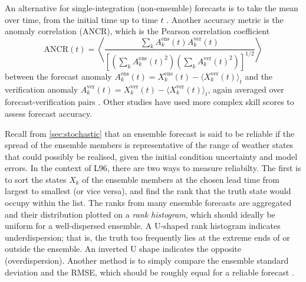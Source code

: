 \documentclass[titlepage,twoside]{article}
\numberwithin{equation}{section}
\begin{document}
An alternative for single-integration
(non-ensemble) forecasts is to take the mean over time, from the initial time
up to time $t$ \parencite{bhouri2023}. Another accuracy metric is the
anomaly correlation (ANCR), which is the Pearson correlation coefficient
\begin{equation*}
    \mathrm{ANCR}(t) = \left\langle
        \frac{
            \sum_k A_k^\text{ens}(t) A_k^\text{ver}(t)
        }{
            \left[
                \left( \sum_k A_k^\text{ens}(t)^2 \right)
                \left( \sum_k A_k^\text{ver}(t)^2 \right)
            \right]^{1/2}
        }
    \right\rangle
\end{equation*}
between the forecast anomaly
$A_k^\text{ens}(t) = X_k^\text{ens}(t) - \langle X_k^\text{ver}(t) \rangle_t$
and the verification anomaly
$A_k^\text{ver}(t) = X_k^\text{ver}(t) - \langle X_k^\text{ver}(t) \rangle_t$,
again averaged over forecast-verification pairs \parencite{crommelin2008}.
Other studies \parencite{kwasniok2012,arnold2013} have used more complex
skill scores to assess forecast accuracy.

Recall from \cref{sec:stochastic} that an ensemble forecast is said to be
reliable if the spread of the ensemble members is representative of the range
of weather states that could possibly be realised, given the initial condition
uncertainty and model errors. In the context of L96, there are two ways to
measure reliabilty. The first \parencite{wilks2005,crommelin2008,kwasniok2012}
is to sort the states $X_k$ of the ensemble members at the chosen lead time
from largest to smallest (or vice versa), and find the rank that the truth
state would occupy within the list. The ranks from many ensemble forecasts are
aggregated and their distribution plotted on a \emph{rank histogram}, which
should ideally be uniform for a well-dispersed ensemble. A U-shaped rank
histogram indicates underdispersion; that is, the truth too frequently lies at
the extreme ends of or outside the ensemble. An inverted U shape indicates the
opposite (overdispersion). Another method is to simply compare the ensemble
standard deviation and the RMSE, which should be roughly equal for a reliable
forecast \parencite{arnold2013,gagne2020}.
\end{document}
